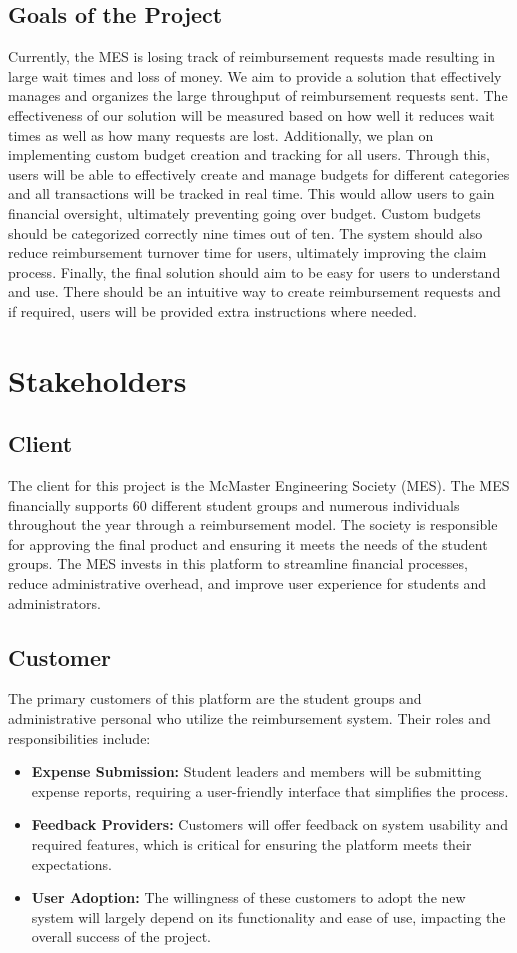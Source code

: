 \documentclass[12pt]{article}
\begin{document}
\subsection{Goals of the Project}
Currently, the MES is losing track of reimbursement requests made resulting in large wait times and loss of money. We aim to provide a solution that effectively manages and organizes the large throughput of reimbursement requests sent. The effectiveness of our solution will be measured based on how well it reduces wait times as well as how many requests are lost.
Additionally, we plan on implementing custom budget creation and tracking for all users. Through this, users will be able to effectively create and manage budgets for different categories and all transactions will be tracked in real time. This would allow users to gain financial oversight, ultimately preventing going over budget. Custom budgets should be categorized correctly nine times out of ten. The system should also reduce reimbursement turnover time for users, ultimately improving the claim process. Finally, the final solution should aim to be easy for users to understand and use. There should be an intuitive way to create reimbursement requests and if required, users will be provided extra instructions where needed.

\section{Stakeholders}
\subsection{Client}
The client for this project is the McMaster Engineering Society (MES). The MES financially supports 60 different student groups and numerous individuals throughout the year through a reimbursement model. The society is responsible for approving the final product and ensuring it meets the needs of the student groups.
The MES invests in this platform to streamline financial processes, reduce administrative overhead, and improve user experience for students and administrators.

\subsection{Customer}
The primary customers of this platform are the student groups and administrative personal who utilize the reimbursement system. Their roles and responsibilities include:
\begin{itemize}
    \item \textbf{Expense Submission:} Student leaders and members will be submitting expense reports, requiring a user-friendly interface that simplifies the process.
    \item \textbf{Feedback Providers:} Customers will offer feedback on system usability and required features, which is critical for ensuring the platform meets their expectations.
    \item \textbf{User Adoption:} The willingness of these customers to adopt the new system will largely depend on its functionality and ease of use, impacting the overall success of the project.
\end{itemize}
\end{document}
